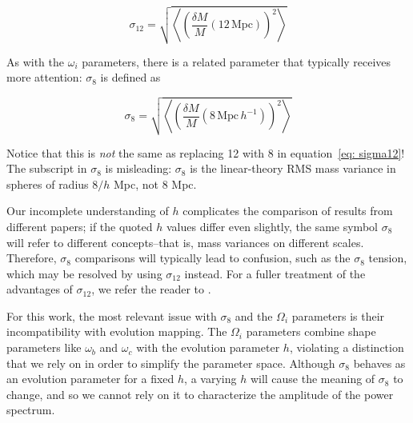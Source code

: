 \begin{equation}
\label{eq: sigma12}
\sigma_{12}
=
\sqrt{\left\langle \left(
	\frac{\delta M}{M} (12 \, \mathrm{Mpc})
\right)^2 \right\rangle}
\end{equation}

As with the $\omega_i$ parameters, there is a related parameter that
typically receives more attention: $\sigma_8$ is defined as

\begin{equation}
\sigma_8
=
\sqrt{\left\langle \left(
	\frac{\delta M}{M} (8 \, \mathrm{Mpc} \, h^{-1})
\right)^2 \right\rangle}
\end{equation}

Notice that this is \textit{not} the same as replacing 12 with 8 in
equation~\ref{eq: sigma12}! The subscript in $\sigma_8$ is misleading:
$\sigma_8$ is the linear-theory RMS mass variance in spheres of radius
$8 / h$ Mpc, not 8 Mpc. 

Our incomplete understanding of $h$ complicates the comparison of results
from different papers; if the quoted $h$ values differ even slightly, the same
symbol $\sigma_8$ will refer to different concepts--that is, mass variances on
different scales. Therefore, $\sigma_8$ comparisons will typically lead to
confusion, such as the $\sigma_8$ tension, which may be resolved by using
$\sigma_{12}$ instead.
For a fuller treatment of the advantages of $\sigma_{12}$, we
refer the reader to \citet{San20}.

For this work, the most relevant issue with $\sigma_8$ and the $\Omega_i$ 
parameters is their incompatibility with evolution mapping. The $\Omega_i$
parameters combine shape parameters like $\omega_b$ and $\omega_c$ with the
evolution parameter $h$, violating a distinction that we rely on in order
to simplify the parameter space. Although $\sigma_8$ behaves as an evolution
parameter for a fixed $h$, a varying $h$ will cause the meaning of $\sigma_8$
to change, and so we cannot rely on it to characterize the amplitude of the
power spectrum.

